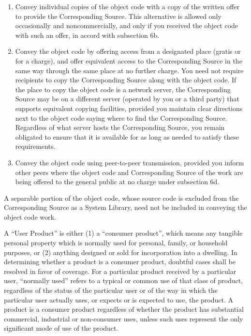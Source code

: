 \documentclass[11pt,twoside,fleqn,openright,titlepage]{cslreport}
\begin{document}
\begin{small}
\begin{enumerate}
\begin{enumerate}
  \item Convey individual copies of the object code with a copy of the
  written offer to provide the Corresponding Source.  This
  alternative is allowed only occasionally and noncommercially, and
  only if you received the object code with such an offer, in accord
  with subsection 6b.

  \item Convey the object code by offering access from a designated
  place (gratis or for a charge), and offer equivalent access to the
  Corresponding Source in the same way through the same place at no
  further charge.  You need not require recipients to copy the
  Corresponding Source along with the object code.  If the place to
  copy the object code is a network server, the Corresponding Source
  may be on a different server (operated by you or a third party)
  that supports equivalent copying facilities, provided you maintain
  clear directions next to the object code saying where to find the
  Corresponding Source.  Regardless of what server hosts the
  Corresponding Source, you remain obligated to ensure that it is
  available for as long as needed to satisfy these requirements.

  \item Convey the object code using peer-to-peer transmission, provided
  you inform other peers where the object code and Corresponding
  Source of the work are being offered to the general public at no
  charge under subsection 6d.
  \end{enumerate}

A separable portion of the object code, whose source code is excluded
from the Corresponding Source as a System Library, need not be
included in conveying the object code work.

A ``User Product'' is either (1) a ``consumer product'', which means any
tangible personal property which is normally used for personal, family,
or household purposes, or (2) anything designed or sold for incorporation
into a dwelling.  In determining whether a product is a consumer product,
doubtful cases shall be resolved in favor of coverage.  For a particular
product received by a particular user, ``normally used'' refers to a
typical or common use of that class of product, regardless of the status
of the particular user or of the way in which the particular user
actually uses, or expects or is expected to use, the product.  A product
is a consumer product regardless of whether the product has substantial
commercial, industrial or non-consumer uses, unless such uses represent
the only significant mode of use of the product.


\end{enumerate}
\end{small}
\end{document}
